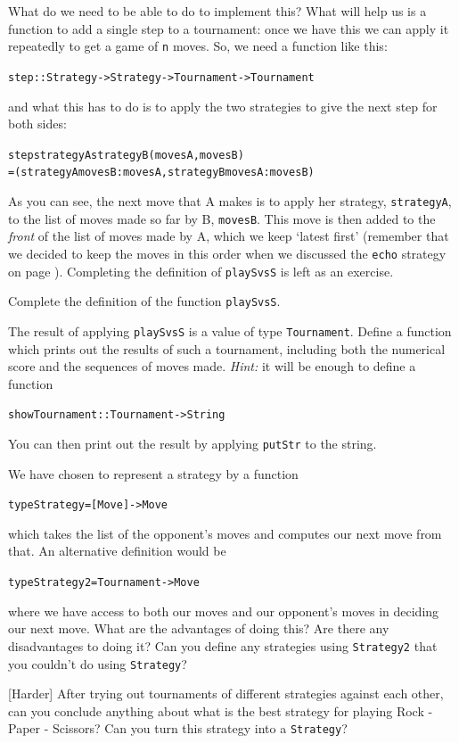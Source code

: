 What do we need to be able to do to implement this? What will help us is a function to add a single step to a tournament: once we have this we can apply it repeatedly to get a game of \texttt{n} moves. So, we need a function like this:
\begin{alltt}
step :: Strategy -> Strategy -> Tournament -> Tournament
\end{alltt}
and what this has to do is to apply the two strategies to give the next step for both sides:
\begin{alltt}
step strategyA strategyB ( movesA, movesB )
     = ( strategyA movesB : movesA , strategyB movesA : movesB )
\end{alltt}
As you can see, the next move that A makes is to apply her strategy, \texttt{strategyA}, to the list of moves made so far by B, \texttt{movesB}. This move is then added to the \emph{front} of the list of moves made by A, which we keep `latest first' (remember that we decided to keep the moves in this order when we discussed the \texttt{echo} strategy on page \pageref{echoStrat}). Completing the definition of \texttt{playSvsS} is left as an exercise.

\begin{exercises}

\item
Complete the definition of the function \texttt{playSvsS}.

\item \label{showTournament}
The result of applying \texttt{playSvsS} is a value of type \texttt{Tournament}. Define a function which prints out the results of such a tournament, including both the numerical score and the sequences of moves made. \emph{Hint:} it will be enough to define a function 
\begin{alltt}
showTournament :: Tournament -> String
\end{alltt}
You can then print out the result by applying \texttt{putStr} to the string.

\item
We have chosen to represent a strategy by a function 
\begin{alltt}
type Strategy = [Move] -> Move
\end{alltt}
which takes the list of the opponent's moves and computes our next move from that. An alternative definition would be
\begin{alltt}
type Strategy2 = Tournament -> Move
\end{alltt}
where we have access to both our moves and our opponent's moves in deciding our next move. What are the advantages of doing this? Are there any disadvantages to doing it?
Can you define any strategies using \texttt{Strategy2} that you couldn't do using \texttt{Strategy}?

\item {[Harder]}
After trying out tournaments of different strategies against each other, can you conclude anything about what is the best strategy for playing Rock - Paper - Scissors?
Can you turn this strategy into a \texttt{Strategy}?


\end{exercises}

